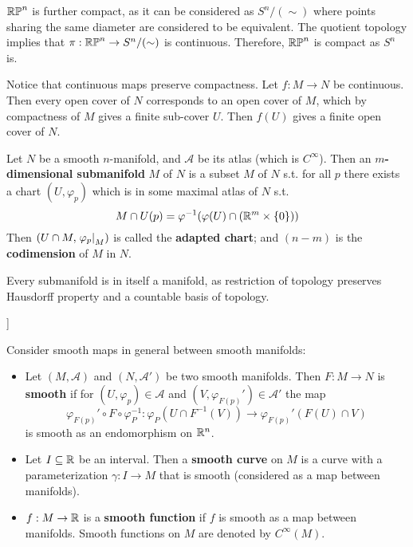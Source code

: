 \documentclass{article}
\begin{document}
\begin{remark}
    $\mathbb{RP}^n$ is further compact, as it can be considered as $S^n / (\sim)$ where points sharing the same diameter are considered to be equivalent. The quotient topology implies that $\pi: \mathbb{RP}^n \to S^n / (\sim)$ is continuous. Therefore, $\mathbb{RP}^n$ is compact as $S^n$ is. 
    
    Notice that continuous maps preserve compactness. Let $f: M \to N$ be continuous. Then every open cover of $N$ corresponds to an open cover of $M$, which by compactness of $M$ gives a finite sub-cover $U$. Then $f(U)$ gives a finite open cover of $N$. 
\end{remark}

\begin{definition}[Submanifold]
    Let $N$ be a smooth $n$-manifold, and $\mathcal{A}$ be its atlas (which is $C^{\infty}$). Then an \textbf{$m$-dimensional submanifold} $M$ of $N$ is a subset $M$ of $N$ s.t. for all $p$ there exists a chart $(U, \varphi_p)$ which is in some maximal atlas of $N$ s.t.
    \[
        M \cap U(p) = \varphi^{-1}(\varphi(U) \cap (\mathbb{R}^m \times \{0\}))
    \] 
    Then $(U \cap M, \left.\varphi_p\right|_{M})$ is called the \textbf{adapted chart}; and $(n - m)$ is the \textbf{codimension} of $M$ in $N$.
\end{definition}

\begin{remark}
    Every submanifold is in itself a manifold, as restriction of topology preserves Hausdorff property and a countable basis of topology.
\end{remark}]

\begin{definition}
    Consider smooth maps in general between smooth manifolds:
    \begin{itemize}
        \item Let $(M, \mathcal{A})$ and $(N, \mathcal{A}')$ be two smooth manifolds. Then $F: M \to N$ is \textbf{smooth} if for $(U, \varphi_p) \in \mathcal{A}$ and $(V, \varphi_{F(p)}') \in \mathcal{A}'$ the map
        \[
            \varphi_{F(p)}' \circ F \circ \varphi_P^{-1} : \varphi_P(U \cap F^{-1}(V)) \to \varphi_{F(p)}' (F(U) \cap V)
        \]
        is smooth as an endomorphism on $\mathbb{R}^n$.
        \item Let $I \subseteq \mathbb{R}$ be an interval. Then a \textbf{smooth curve} on $M$ is a curve with a parameterization $\gamma: I \to M$ that is smooth (considered as a map between manifolds). 
        \item $f: M \to \mathbb{R}$ is a \textbf{smooth function} if $f$ is smooth as a map between manifolds. Smooth functions on $M$ are denoted by $C^{\infty}(M)$.
    \end{itemize}
\end{definition}
\end{document}
